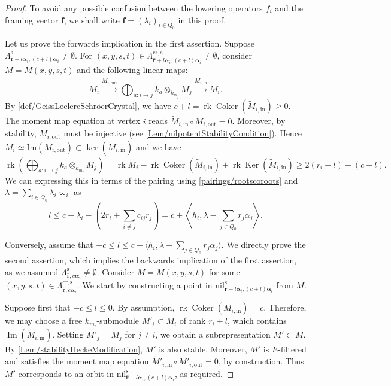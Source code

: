 \documentclass[a4paper,12pt]{article}
\theoremstyle{definition}
\theoremstyle{plain}
\theoremstyle{remark}
\DeclareMathOperator{\Coker}{Coker}
\DeclareMathOperator{\Ker}{Ker}
\DeclareMathOperator{\Ima}{Im}
\DeclareMathOperator{\rk}{rk}
\newcommand{\st}{\mathrm{s}}
\newcommand\bfalpha{\bm{\alpha}}
\newcommand\bff{\mathbf{f}}
\newcommand\bfr{\mathbf{r}}
\begin{document}
\begin{proof} To avoid any possible confusion between the lowering operators $f_i$ and the framing vector $\bff$, we shall write $\bff = (\lambda_i)_{i \in Q_0}$ in this proof. 

Let us prove the forwards implication in the first assertion. Suppose $\Lambda_{\widehat{\bfr}+l\bfalpha_i,(c+l)\bfalpha_i}^\st\ne\emptyset$. For $(x,y,s,t)\in\Lambda_{\widehat{\bfr}+l\bfalpha_i,(c+l)\bfalpha_i}^{\mathrm{cr},\st}\ne\emptyset$, consider $M=M(x,y,s,t)$ and the following linear maps:
\[
M_i
\overset{M_{i,\mathrm{out}}}{\rightarrow}
\bigoplus_{a:i\rightarrow j}k_a\otimes_{k_{m_j}}M_j
\overset{\widetilde{M}_{i,\mathrm{in}}}{\rightarrow}
M_i
.
\]
By \cref{def/GeissLeclercSchröerCrystal}, we have $c+l=\rk\Coker(\widetilde{M}_{i,\mathrm{in}})\geq0$. The moment map equation at vertex $i$ reads $\widetilde{M}_{i,\mathrm{in}}\circ M_{i,\mathrm{out}}=0$. Moreover, by stability, $M_{i,\mathrm{out}}$ must be injective (see \cref{Lem/nilpotentStabilityCondition}). Hence $M_i \simeq \mathrm{Im}(M_{i,\mathrm{out}}) \subset \ker(\widetilde{M}_{i,\mathrm{in}})$ and we have
\[
\rk\left(\bigoplus_{a:i\rightarrow j}k_a\otimes_{k_{m_j}}M_j\right)
=
\rk M_i-\rk\Coker(\widetilde{M}_{i,\mathrm{in}})+\rk\Ker(\widetilde{M}_{i,\mathrm{in}})
\geq
2(r_i+l)-(c+l).
\]
We can expressing this in terms of the pairing using \eqref{pairings/rootscoroots} and $\lambda=\sum_{i\in Q_0}\lambda_i\varpi_i$ as
\[
l\leq c+\lambda_i-\left(2r_i+\sum_{i\ne j}c_{ij}r_j\right)=c+\left\langle h_i,\lambda-\sum_{j\in Q_0}r_j\alpha_j\right\rangle
.
\]

Conversely, assume that $-c\leq l\leq c+\langle h_i,\lambda-\sum_{j\in Q_0}r_j\alpha_j\rangle$. We directly prove the second assertion, which implies the backwards implication of the first assertion, as we assumed $\Lambda_{\widehat{\bfr},c\bfalpha_i}^\st\ne\emptyset$. Consider $M=M(x,y,s,t)$ for some $(x,y,s,t)\in\Lambda_{\widehat{\bfr},c\bfalpha_i}^{\mathrm{cr},\st}$. We start by constructing a point in $\mathrm{nil}_{\widehat{\bfr}+l\bfalpha_i,(c+l)\bfalpha_i}^{\st}$ from $M$.

Suppose first that $-c\leq l\leq 0$. By assumption, $\rk\Coker(M_{i,\mathrm{in}})=c$. Therefore, we may choose a free $k_{m_i}$-submodule $M'_i\subset M_i$ of rank $r_i+l$, which contains $\Ima(\widetilde{M}_{i,\mathrm{in}})$. Setting $M'_j=M_j$ for $j\ne i$, we obtain a subrepresentation $M'\subset M$. By \cref{Lem/stabilityHeckeModification}, $M'$ is also stable. Moreover, $M'$ is $E$-filtered and satisfies the moment map equation $\widetilde{M}'_{i,\mathrm{in}}\circ M'_{i,\mathrm{out}}=0$, by construction. Thus $M'$ corresponds to an orbit in $\mathrm{nil}_{\widehat{\bfr}+l\bfalpha_i,(c+l)\bfalpha_i}^{\st}$, as required.


\end{proof}
\end{document}
